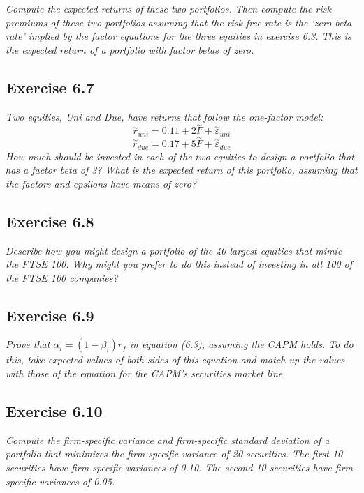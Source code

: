 \documentclass[]{book}
\theoremstyle{definition}
\theoremstyle{definition}
\theoremstyle{remark}
\begin{document}
\emph{Compute the expected returns of these two portfolios. Then compute
the risk premiums of these two portfolios assuming that the risk-free
rate is the `zero-beta rate' implied by the factor equations for the
three equities in exercise 6.3. This is the expected return of a
portfolio with factor betas of zero.} \citep[p.198]{book}

\subsection{Exercise 6.7}\label{exercise-6.7}

\emph{Two equities, Uni and Due, have returns that follow the one-factor
model:} \citep[p.198]{book}
\[\overset{\sim}{r}_{uni}=0.11+2\overset{\sim}{F}+\overset{\sim}{\varepsilon}_{uni}\]
\[\overset{\sim}{r}_{due}=0.17+5\overset{\sim}{F}+\overset{\sim}{\varepsilon}_{due}\]
\emph{How much should be invested in each of the two equities to design
a portfolio that has a factor beta of 3? What is the expected return of
this portfolio, assuming that the factors and epsilons have means of
zero?} \citep[p.198]{book}

\subsection{Exercise 6.8}\label{exercise-6.8}

\emph{Describe how you might design a portfolio of the 40 largest
equities that mimic the FTSE 100. Why might you prefer to do this
instead of investing in all 100 of the FTSE 100 companies?}
\citep[p.198]{book}

\subsection{Exercise 6.9}\label{exercise-6.9}

\emph{Prove that \(\alpha_i=\left(1-\beta_i\right) r_f\) in equation
(6.3), assuming the CAPM holds. To do this, take expected values of both
sides of this equation and match up the values with those of the
equation for the CAPM's securities market line.} \citep[p.198]{book}

\subsection{Exercise 6.10}\label{exercise-6.10}

\emph{Compute the firm-specific variance and firm-specific standard
deviation of a portfolio that minimizes the firm-specific variance of 20
securities. The first 10 securities have firm-specific variances of
0.10. The second 10 securities have firm-specific variances of 0.05.}
\citep[p.199]{book}
\end{document}
